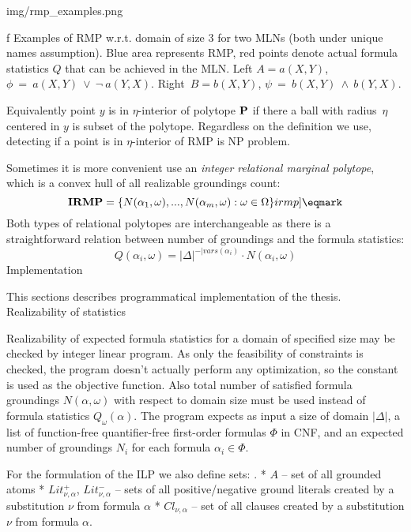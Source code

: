 \topinsert {}
\picheight=7.5cm \cinspic  img/rmp_examples.png
\caption/f Examples of RMP w.r.t. domain of size 3 for two MLNs (both under unique names assumption). Blue area represents RMP, red points denote actual formula statistics $Q$ that can be achieved in the MLN. {\sbf Left} $A= a(X,Y)$, $\phi~=~a(X,Y)~\lor~\neg~a(Y,X)$. {\sbf Right}~$B=b(X,Y)$, $\psi~=~b(X,Y)~\land~b(Y,X)$.
\endinsert

\par 
Equivalently point $y$ is in $\eta$-interior of polytope ${\bf P}$ if there a ball with radius~$\eta$ centered in $y$ is subset of the polytope. Regardless on the definition we use, detecting if a point is in $\eta$-interior of RMP is NP problem.

\par 
Sometimes it is more convenient use an {\it integer relational marginal polytope}, which is a convex hull of all realizable groundings count:
$$ {\bf IRMP} = \{N(\alpha_1, \omega), ..., N(\alpha_m, \omega) : \omega \in \Omega \} \label[irmp]\eqmark$$
Both types of relational polytopes are interchangeable as there is a straightforward relation between number of groundings and the formula statistics: 
$$Q(\alpha_i, \omega) = |\Delta|^{-|vars(\alpha_i)} \cdot N(\alpha_i, \omega) $$
%
\chap Implementation
\par 
This sections describes programmatical implementation of the thesis.
\sec Realizability of statistics
\par
Realizability of expected formula statistics for a domain of specified size may be checked by integer linear program. As only the feasibility of constraints is checked, the program doesn't actually perform any optimization, so the constant is used as the objective function. Also total number of satisfied formula groundings $N(\alpha, \omega)$ with respect to domain size must be used instead of formula statistics $Q_{\omega}(\alpha)$. The program expects as input a size of domain $|\Delta|$, a list of function-free quantifier-free first-order formulas $\Phi$ in CNF, and an expected number of groundings $N_i$ for each formula $\alpha_i \in \Phi$.
\par 
For the formulation of the ILP we also define sets:
\begitems \style .
* $A$ -- set of all grounded atoms
* $Lit^+_{\nu, \alpha}$, $Lit^-_{\nu, \alpha}$ -- sets of all positive/negative ground  literals created by a substitution $\nu$ from formula $\alpha$
* $Cl_{\nu, \alpha}$ -- set of all clauses created by a substitution $\nu$ from formula $\alpha$.
